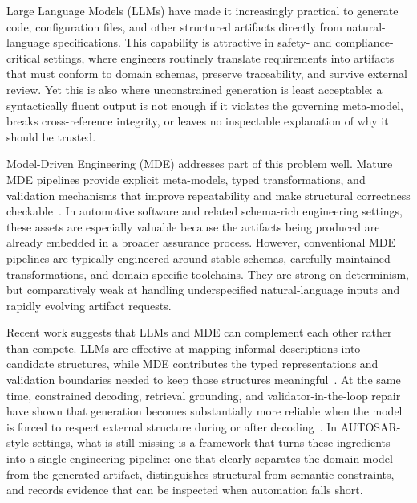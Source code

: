 \documentclass[acmlarge,nonacm]{acmart}
\theoremstyle{acmplain}
\theoremstyle{acmdefinition}
\begin{document}
Large Language Models (LLMs) have made it increasingly practical to generate code, configuration files, and other structured artifacts directly from natural-language specifications. This capability is attractive in safety- and compliance-critical settings, where engineers routinely translate requirements into artifacts that must conform to domain schemas, preserve traceability, and survive external review. Yet this is also where unconstrained generation is least acceptable: a syntactically fluent output is not enough if it violates the governing meta-model, breaks cross-reference integrity, or leaves no inspectable explanation of why it should be trusted.

Model-Driven Engineering (MDE) addresses part of this problem well. Mature MDE pipelines provide explicit meta-models, typed transformations, and validation mechanisms that improve repeatability and make structural correctness checkable~\cite{omg2003mda,kahaniSurveyClassificationModel2019,delavaraModelbasedSpecificationSafety2016}. In automotive software and related schema-rich engineering settings, these assets are especially valuable because the artifacts being produced are already embedded in a broader assurance process. However, conventional MDE pipelines are typically engineered around stable schemas, carefully maintained transformations, and domain-specific toolchains. They are strong on determinism, but comparatively weak at handling underspecified natural-language inputs and rapidly evolving artifact requests.

Recent work suggests that LLMs and MDE can complement each other rather than compete. LLMs are effective at mapping informal descriptions into candidate structures, while MDE contributes the typed representations and validation boundaries needed to keep those structures meaningful~\cite{Petrovic_2024,Alaoui2025,Patil2025}. At the same time, constrained decoding, retrieval grounding, and validator-in-the-loop repair have shown that generation becomes substantially more reliable when the model is forced to respect external structure during or after decoding~\cite{scholakPICARDParsingIncrementally2021,poesiaSynchromeshReliableCode2021,gengGrammarConstrainedDecodingStructured2024,zhangKnowGPTKnowledgeGraph2024,tangCodeRepairLLMs2024,shinn2023reflexion,chen2024selfdebug}. In AUTOSAR-style settings, what is still missing is a framework that turns these ingredients into a single engineering pipeline: one that clearly separates the domain model from the generated artifact, distinguishes structural from semantic constraints, and records evidence that can be inspected when automation falls short.
\end{document}
